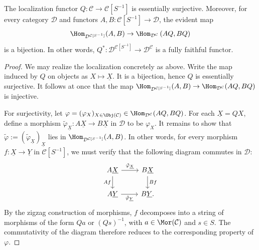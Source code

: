 \begin{proposition}\label{prop:localization-extra-property}
	The localization functor $Q:\mathcal{C}\to\mathcal{C}[S^{-1}]$ is
	essentially surjective. Moreover, for every category $\mathcal{D}$ and
	functors $A,B:\mathcal{C}[S^{-1}]\to\mathcal{D}$, the evident map
	\[ \Hom_{\mathcal{D}^{\mathcal{C}[S^{-1}]}}(A,B) \to \Hom_{\mathcal{D}^{\mathcal{C}}}\left(AQ,BQ\right) \]
	is a bijection. In other words,
	$Q^*:\mathcal{D}^{\mathcal{C}[S^{-1}]}\to\mathcal{D}^{\mathcal{C}}$ is a
	fully faithful functor.
\end{proposition}
\begin{proof}
	We may realize the localization concretely as above. Write the map induced
	by $Q$ on objects as $X\mapsto\underline{X}$. It is a bijection, hence $Q$
	is essentially surjective. It follows at once that the map
	$\Hom_{\mathcal{D}^{\mathcal{C}[S^{-1}]}}(A,B)\to
	\Hom_{\mathcal{D}^{\mathcal{C}}}(AQ,BQ)$ is injective.

	For surjectivity, let
	$\varphi=(\varphi_X)_{X\in\Obj(\mathcal{C})}\in
	\Hom_{\mathcal{D}^{\mathcal{C}}}(AQ,BQ)$. For each
	$\underline{X}=QX$, define a morphism
	$\tilde{\varphi}_{\underline{X}}:A\underline{X}\to B\underline{X}$ in
	$\mathcal{D}$ to be $\varphi_X$. It remains to show that
	$\tilde{\varphi}:=(\tilde{\varphi}_{\underline{X}})_{\underline{X}}$ lies
	in $\Hom_{\mathcal{D}^{\mathcal{C}[S^{-1}]}}(A,B)$. In other words, for
	every morphism $f:\underline{X}\to\underline{Y}$ in
	$\mathcal{C}[S^{-1}]$, we must verify that the following diagram commutes in
	$\mathcal{D}$:
	\[\begin{tikzcd}
		A\underline{X} \arrow[r, "{\tilde{\varphi}_{\underline{X}}}"] \arrow[d, "Af"'] & B\underline{X} \arrow[d, "Bf"] \\
		A\underline{Y} \arrow[r, "{\tilde{\varphi}_{\underline{Y}}}"'] & B\underline{Y} .
	\end{tikzcd}\]
	By the zigzag construction of morphisms, $f$ decomposes into a string of
	morphisms of the form $Qa$ or $(Qs)^{-1}$, with
	$a\in\Mor(\mathcal{C})$ and $s\in S$. The commutativity of the diagram
	therefore reduces to the corresponding property of $\varphi$.
\end{proof}

